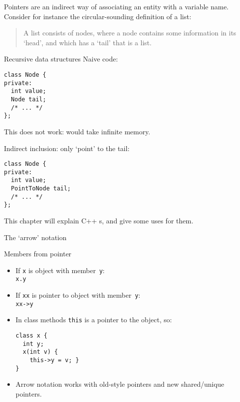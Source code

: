 

Pointers are an indirect way of associating an entity with a variable
name. Consider for instance the circular-sounding definition of a list:
\begin{quote}
  A list consists of nodes,
  where a node contains some information in its `head',
  and which has a `tail' that is a list.
\end{quote}

\begin{block}{Recursive data structures}
  \label{sl:recursive-node}
Naive code:
\begin{lstlisting}
class Node {
private:
  int value;
  Node tail;
  /* ... */
};
\end{lstlisting}
This does not work: would take infinite memory.

Indirect inclusion: only `point' to the tail:
\begin{lstlisting}
class Node {
private:
  int value;
  PointToNode tail;
  /* ... */
};
\end{lstlisting}
\end{block}

This chapter will explain C++ s, and give some uses for them.

 {The `arrow' notation}

\begin{block}{Members from pointer}
  \begin{itemize}
  \item If \lstinline{x} is object with member~\lstinline{y}:\\ \lstinline{x.y}
  \item If \lstinline{xx} is pointer to object with member~\lstinline{y}:\\ \lstinline{xx->y}
  \item In class methods \lstinline{this} is a pointer to the object, so:
\begin{lstlisting}
class x {
  int y;
  x(int v) {
    this->y = v; }
}
\end{lstlisting}
\item Arrow notation works with old-style pointers and new
  shared/unique pointers.
  \end{itemize}
\end{block}

